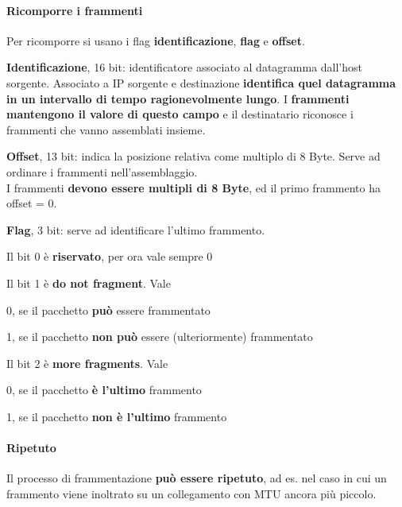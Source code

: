 \documentclass[10pt]{article}
\begin{document}
\paragraph{Ricomporre i frammenti} Per ricomporre si usano i flag \textbf{identificazione}, \textbf{flag} e \textbf{offset}.
\begin{list}{}{}
\item \textbf{Identificazione}, 16 bit: identificatore associato al datagramma dall'host sorgente. Associato a IP sorgente e destinazione \textbf{identifica quel datagramma in un intervallo di tempo ragionevolmente lungo}. I \textbf{frammenti mantengono il valore di questo campo} e il destinatario riconosce i frammenti che vanno assemblati insieme.
\item \textbf{Offset}, 13 bit: indica la posizione relativa come multiplo di 8 Byte. Serve ad ordinare i frammenti nell'assemblaggio.\\
I frammenti \textbf{devono essere multipli di 8 Byte}, ed il primo frammento ha offset = 0.
\item \textbf{Flag}, 3 bit: serve ad identificare l'ultimo frammento.
\begin{list}{}{3 bit}
\item Il bit 0 è \textbf{riservato}, per ora vale sempre 0
\item Il bit 1 è \textbf{do not fragment}. Vale
\begin{list}{}{}
\item 0, se il pacchetto \textbf{può} essere frammentato
\item 1, se il pacchetto \textbf{non può} essere (ulteriormente) frammentato
\end{list}
\item Il bit 2 è \textbf{more fragments}. Vale
\begin{list}{}{}
\item 0, se il pacchetto \textbf{è l'ultimo} frammento
\item 1, se il pacchetto \textbf{non è l'ultimo} frammento
\end{list}
\end{list}
\end{list}
\paragraph{Ripetuto} Il processo di frammentazione \textbf{può essere ripetuto}, ad es. nel caso in cui un frammento viene inoltrato su un collegamento con MTU ancora più piccolo.
\end{document}

